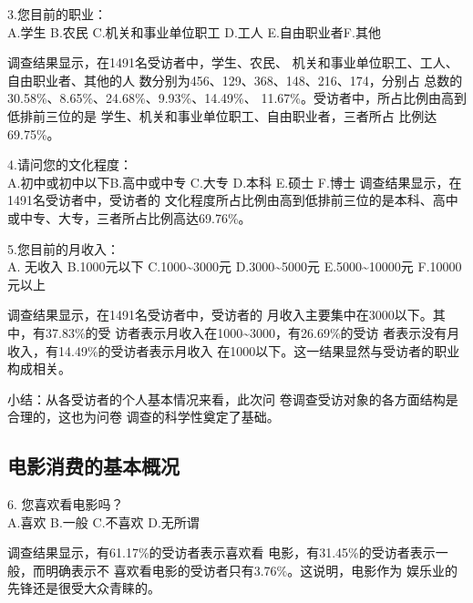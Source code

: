 \documentclass[12pt,twoside]{article}
\newcommand{\heiti}{\CJKfamily{heiti}\enhei}
\begin{document}
\par\noindent 3.您目前的职业：\\
A.学生 \tabskips B.农民 \tabskips C.机关和事业单位职工 \tabskips
D.工人 \tabskips E.自由职业者\tabskips F.其他
\par 调查结果显示，在1491名受访者中，学生、农民、
机关和事业单位职工、工人、自由职业者、其他的人
数分别为456、129、368、148、216、174，分别占
总数的30.58\%、8.65\%、24.68\%、9.93\%、14.49\%、 11.67\%。受访者中，所占比例由高到低排前三位的是
学生、机关和事业单位职工、自由职业者，三者所占
比例达69.75\%。
\par\noindent 4.请问您的文化程度：\\
A.初中或初中以下\tabskips  B.高中或中专 \tabskips C.大专\tabskips
D.本科 \tabskips  E.硕士 \tabskips F.博士
调查结果显示，在1491名受访者中，受访者的
文化程度所占比例由高到低排前三位的是本科、高中
或中专、大专，三者所占比例高达69.76\%。
\par\noindent 5.您目前的月收入：\\
A. 无收入  B.1000元以下
C.1000\textasciitilde 3000元 D.3000\textasciitilde5000元
E.5000\textasciitilde10000元  F.10000元以上
\par 调查结果显示，在1491名受访者中，受访者的
月收入主要集中在3000以下。其中，有37.83\%的受
访者表示月收入在1000\textasciitilde3000，有26.69\%的受访
者表示没有月收入，有14.49\%的受访者表示月收入
在1000以下。这一结果显然与受访者的职业构成相关。
\par {\heiti 小结：从各受访者的个人基本情况来看，此次问
卷调查受访对象的各方面结构是合理的，这也为问卷
调查的科学性奠定了基础。}

\subsection{电影消费的基本概况}
6. 您喜欢看电影吗？ \\
A.喜欢 \tabskips B.一般 \tabskips C.不喜欢 \tabskips D.无所谓
\par
调查结果显示，有61.17\%的受访者表示喜欢看
电影，有31.45\%的受访者表示一般，而明确表示不
喜欢看电影的受访者只有3.76\%。这说明，电影作为
娱乐业的先锋还是很受大众青睐的。
\end{document}
